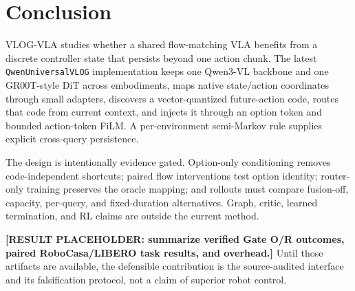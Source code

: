 \section{Conclusion}

VLOG-VLA studies whether a shared flow-matching VLA benefits from a discrete
controller state that persists beyond one action chunk.  The latest
\texttt{QwenUniversalVLOG} implementation keeps one Qwen3-VL backbone and one
GR00T-style DiT across embodiments, maps native state/action coordinates through
small adapters, discovers a vector-quantized future-action code, routes that
code from current context, and injects it through an option token and bounded
action-token FiLM.  A per-environment semi-Markov rule supplies explicit
cross-query persistence.

The design is intentionally evidence gated.  Option-only conditioning removes
code-independent shortcuts; paired flow interventions test option identity;
router-only training preserves the oracle mapping; and rollouts must compare
fusion-off, capacity, per-query, and fixed-duration alternatives.  Graph,
critic, learned termination, and RL claims are outside the current method.

\textbf{[RESULT PLACEHOLDER: summarize verified Gate O/R outcomes, paired
RoboCasa/LIBERO task results, and overhead.]}
Until those artifacts are available, the defensible contribution is the
source-audited interface and its falsification protocol, not a claim of superior
robot control.
